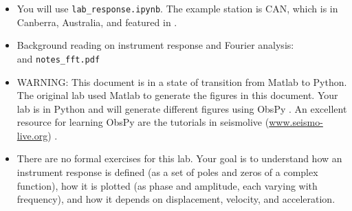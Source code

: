 \documentclass[11pt,titlepage,fleqn]{article}
\newcommand{\tfile}{{\tt lab\_response.ipynb}}
\begin{document}
\begin{itemize}

\item You will use \tfile. The example station is CAN, which is in Canberra, Australia, and featured in \citet[][Figure~1]{Park2005}.


\item Background reading on instrument response and Fourier analysis: \\ \citet[][Ch.~6]{SteinWysession} and \verb+notes_fft.pdf+


\item WARNING: This document is in a state of transition from Matlab to Python. The original lab used Matlab to generate the figures in this document. Your lab is in Python and will generate different figures using ObsPy \citep{obspy2010,obspy2011,obspy2015}. An excellent resource for learning ObsPy are the tutorials in seismolive (\url{www.seismo-live.org}) \citep{seismolive}.









\item There are no formal exercises for this lab. Your goal is to understand how an instrument response is defined (\eg as a set of poles and zeros of a complex function), how it is plotted (\eg as phase and amplitude, each varying with frequency), and how it depends on displacement, velocity, and acceleration.

\end{itemize}
\end{document}
